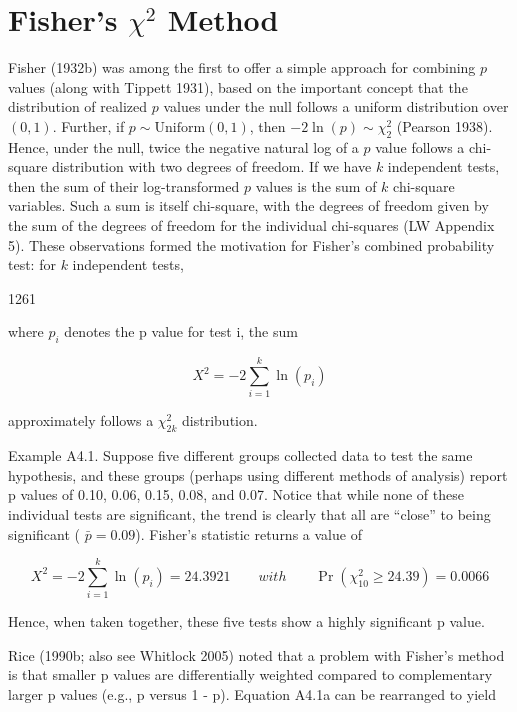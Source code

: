 \documentclass{article}
\begin{document}
\section{Fisher's  $ \chi^{2} $ Method}
Fisher (1932b) was among the first to offer a simple approach for combining $p$ values (along with Tippett 1931), based on the important concept that the distribution of realized $p$ values under the null follows a uniform distribution over $(0,1)$. Further, if $p \sim \text{Uniform}(0,1)$, then $-2 \ln(p) \sim \chi_{2}^{2}$ (Pearson 1938). Hence, under the null, twice the negative natural log of a $p$ value follows a chi-square distribution with two degrees of freedom. If we have $k$ independent tests, then the sum of their log-transformed $p$ values is the sum of $k$ chi-square variables. Such a sum is itself chi-square, with the degrees of freedom given by the sum of the degrees of freedom for the individual chi-squares (LW Appendix 5). These observations formed the motivation for Fisher's combined probability test: for $k$ independent tests,

1261

where  $ p_{i} $ denotes the p value for test i, the sum

\begin{equation}
X^{2}=-2\sum_{i=1}^{k}\ln(p_{i})
\end{equation}

approximately follows a  $ \chi_{2k}^{2} $ distribution.

Example A4.1. Suppose five different groups collected data to test the same hypothesis, and these groups (perhaps using different methods of analysis) report p values of 0.10, 0.06, 0.15, 0.08, and 0.07. Notice that while none of these individual tests are significant, the trend is clearly that all are “close” to being significant ( $ \bar{p} = 0.09 $). Fisher’s statistic returns a value of

\begin{equation}
X^{2}=-2\sum_{i=1}^{k}\ln(p_{i})=24.3921\qquad with\qquad\Pr(\chi_{10}^{2}\geq24.39)=0.0066
\end{equation}

Hence, when taken together, these five tests show a highly significant p value.

Rice (1990b; also see Whitlock 2005) noted that a problem with Fisher's method is that smaller p values are differentially weighted compared to complementary larger p values (e.g., p versus 1 - p). Equation A4.1a can be rearranged to yield
\end{document}
